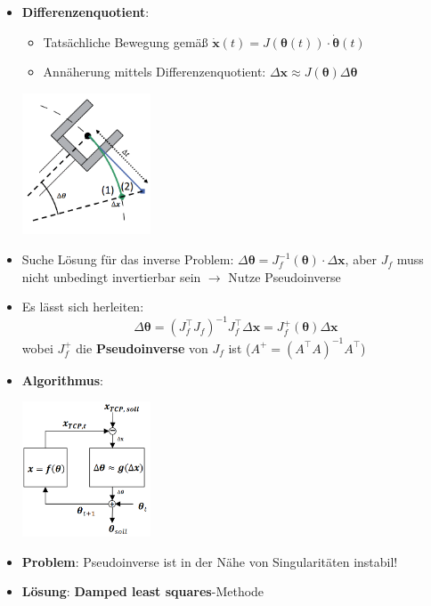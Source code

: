 \begin{itemize}
	\item \textbf{Differenzenquotient}: 
	\begin{itemize}
		\item Tatsächliche Bewegung gemäß $\mathbf{\dot{x}}(t)=J(\boldsymbol{\theta}(t))\cdot\boldsymbol{\dot{\theta}}(t)$
		\item Annäherung mittels Differenzenquotient: $\Delta\mathbf{x}\approx J(\boldsymbol{\theta})\Delta\boldsymbol{\theta}$
	\end{itemize}
	\begin{center}
		\includegraphics[width=0.3\textwidth]{images/dq.png}
	\end{center}
	\item Suche Lösung für das inverse Problem: $\Delta\boldsymbol{\theta}=J_f^{-1}(\boldsymbol{\theta})\cdot\Delta\mathbf{x}$, aber $J_f$ muss nicht unbedingt invertierbar sein $\rightarrow$ Nutze Pseudoinverse
	\item Es lässt sich herleiten: $$\Delta\boldsymbol{\theta}=(J_f^\top J_f)^{-1}J_f^\top \Delta\mathbf{x}=J_f^+(\boldsymbol{\theta})\Delta\mathbf{x}$$
	wobei $J_f^+$ die \textbf{Pseudoinverse} von $J_f$ ist ($A^+=(A^\top A)^{-1}A^\top$)
	\item \textbf{Algorithmus}:
	\begin{center}
		\includegraphics[width=0.3\textwidth]{images/pseudoinverse.png}
	\end{center}
	\item \textbf{Problem}: Pseudoinverse ist in der Nähe von Singularitäten instabil!
	\item \textbf{Lösung}: \textbf{Damped least squares}-Methode
\end{itemize}

